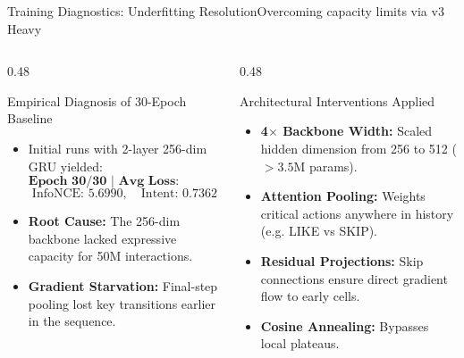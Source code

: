 \documentclass[aspectratio=169,10pt]{beamer}
\begin{document}
\begin{frame}{Training Diagnostics: Underfitting Resolution}{Overcoming capacity limits via v3 Heavy}
    \begin{columns}[T]
        \begin{column}{0.48\textwidth}
            \begin{alertblock}{Empirical Diagnosis of 30-Epoch Baseline}
                \begin{itemize}\small
                    \item Initial runs with 2-layer 256-dim GRU yielded:
                    $$\textbf{Epoch 30/30 | Avg Loss: 5.9199}$$
                    $$\text{InfoNCE: } 5.6990, \quad \text{Intent: } 0.7362$$
                    \item \textbf{Root Cause:} The 256-dim backbone lacked expressive capacity for 50M interactions.
                    \item \textbf{Gradient Starvation:} Final-step pooling lost key transitions earlier in the sequence.
                \end{itemize}
            \end{alertblock}
        \end{column}

        \begin{column}{0.48\textwidth}
            \begin{exampleblock}{Architectural Interventions Applied}
                \begin{itemize}\small
                    \item \textbf{4$\times$ Backbone Width:} Scaled hidden dimension from 256 to 512 ($>3.5\text{M}$ params).
                    \item \textbf{Attention Pooling:} Weights critical actions anywhere in history (e.g. LIKE vs SKIP).
                    \item \textbf{Residual Projections:} Skip connections ensure direct gradient flow to early cells.
                    \item \textbf{Cosine Annealing:} Bypasses local plateaus.
                \end{itemize}
            \end{exampleblock}
        \end{column}
    \end{columns}
\end{frame}
\end{document}
